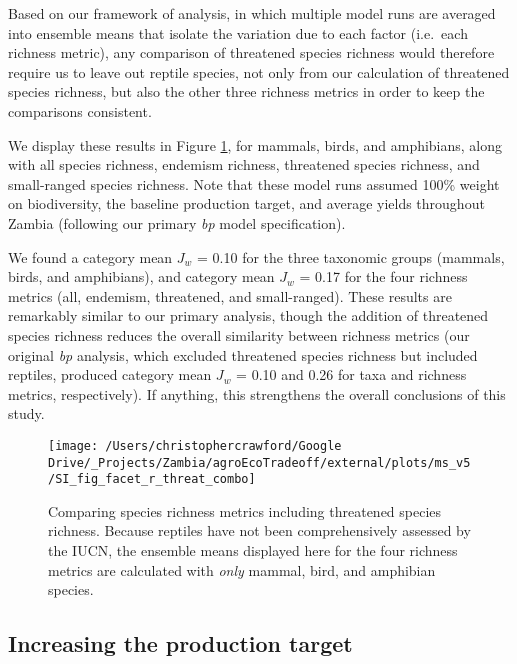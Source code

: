 \documentclass[
]{article}
\begin{document}
Based on our framework of analysis, in which multiple model runs are averaged into ensemble means that isolate the variation due to each factor (i.e.~each richness metric), any comparison of threatened species richness would therefore require us to leave out reptile species, not only from our calculation of threatened species richness, but also the other three richness metrics in order to keep the comparisons consistent.

We display these results in Figure \ref{fig:threat-richness}, for mammals, birds, and amphibians, along with all species richness, endemism richness, threatened species richness, and small-ranged species richness. Note that these model runs assumed 100\% weight on biodiversity, the baseline production target, and average yields throughout Zambia (following our primary \emph{bp} model specification).

We found a category mean \(J_w\) = 0.10 for the three taxonomic groups (mammals, birds, and amphibians), and category mean \(J_w\) = 0.17 for the four richness metrics (all, endemism, threatened, and small-ranged). These results are remarkably similar to our primary analysis, though the addition of threatened species richness reduces the overall similarity between richness metrics (our original \emph{bp} analysis, which excluded threatened species richness but included reptiles, produced category mean \(J_w\) = 0.10 and 0.26 for taxa and richness metrics, respectively). If anything, this strengthens the overall conclusions of this study.



\begin{figure}

{\centering \texttt{[image: /Users/christophercrawford/Google Drive/\_Projects/Zambia/agroEcoTradeoff/external/plots/ms\_v5/SI\_fig\_facet\_r\_threat\_combo]} 

}

\caption{Comparing species richness metrics including threatened species richness. Because reptiles have not been comprehensively assessed by the IUCN, the ensemble means displayed here for the four richness metrics are calculated with \emph{only} mammal, bird, and amphibian species.}\label{fig:threat-richness}
\end{figure}

\newpage

\hypertarget{section-prod-targ}{%
\subsection{Increasing the production target}\label{section-prod-targ}}
\end{document}
